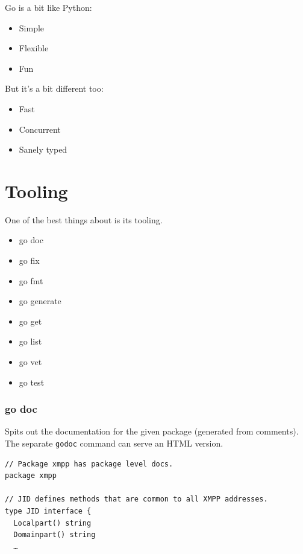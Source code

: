 \documentclass[xelatex,aspectratio=169]{beamer}
\begin{document}
\begin{frame}
	Go is a bit like Python:
	\begin{itemize}
			\item Simple
			\item Flexible
			\item Fun
	\end{itemize}
	But it's a bit different too:
	\begin{itemize}
			\item Fast
			\item Concurrent
			\item Sanely typed
	\end{itemize}
\end{frame}


\section[]{Tooling}
\frame{\sectionpage}

\begin{frame}
	\begin{flushleft}
		One of the best things about is its tooling.
	\end{flushleft}
	\begin{itemize}
		\item go doc
		\item go fix
		\item go fmt
		\item go generate
		\item go get
		\item go list
		\item go vet
		\item go test
	\end{itemize}
\end{frame}

\begin{frame}[fragile]
	\frametitle{go doc}
	\begin{flushleft}
		Spits out the documentation for the given package (generated from comments).
		The separate \texttt{godoc} command can serve an HTML version.
	\end{flushleft}
	\renewcommand{\fcolorbox}[4][]{#4}
\begin{verbatim}
// Package xmpp has package level docs.
package xmpp

// JID defines methods that are common to all XMPP addresses.
type JID interface {
  Localpart() string
  Domainpart() string
  …
\end{verbatim}
\end{frame}
\end{document}
